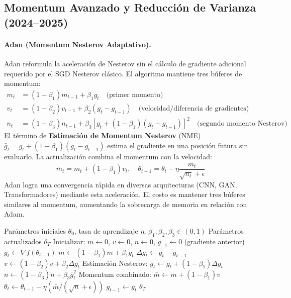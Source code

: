 \subsection{Momentum Avanzado y Reducción de Varianza (2024--2025)}
\paragraph{Adan (Momentum Nesterov Adaptativo).}
Adan reformula la aceleración de Nesterov sin el cálculo de gradiente adicional requerido por el SGD Nesterov clásico. El algoritmo mantiene tres búferes de momentum:
\begin{align}
m_t &= (1-\beta_1)m_{t-1} + \beta_1 g_t \quad\text{(primer momento)} \\
v_t &= (1-\beta_2)v_{t-1} + \beta_2(g_t - g_{t-1}) \quad\text{(velocidad/diferencia de gradientes)} \\
n_t &= (1-\beta_3)n_{t-1} + \beta_3[g_t + (1-\beta_1)(g_t-g_{t-1})]^2 \quad\text{(segundo momento Nesterov)}
\end{align}
El término de \textbf{Estimación de Momentum Nesterov} (NME) $\bar{g}_t = g_t + (1-\beta_1)(g_t-g_{t-1})$ estima el gradiente en una posición futura sin evaluarlo. La actualización combina el momentum con la velocidad:
\[\bar{m}_t = m_t + (1-\beta_1)v_t, \quad \theta_{t+1} = \theta_t - \eta\frac{\bar{m}_t}{\sqrt{n_t}+\epsilon}\]
Adan logra una convergencia rápida en diversas arquitecturas (CNN, GAN, Transformadores) mediante esta aceleración. El costo es mantener tres búferes similares al momentum, aumentando la sobrecarga de memoria en relación con Adam.

\begin{algorithm}[H]
\caption{Adan (Momentum Nesterov Adaptativo)}
\label{alg:adan}
\begin{algorithmic}[1]
\Require Parámetros iniciales $\theta_0$, tasa de aprendizaje $\eta$, $\beta_1, \beta_2, \beta_3 \in (0,1)$
\Ensure Parámetros actualizados $\theta_T$
\State Inicializar: $m \gets 0$, $v \gets 0$, $n \gets 0$, $g_{-1} \gets 0$ (gradiente anterior)
    \State $g_t \gets \nabla f(\theta_{t-1})$
    \State $m \gets (1-\beta_1) m + \beta_1 g_t$
    \State $\Delta g_t \gets g_t - g_{t-1}$
    \State $v \gets (1-\beta_2) v + \beta_2 \Delta g_t$
    \State Estimación Nesterov: $\bar{g}_t \gets g_t + (1-\beta_1) \Delta g_t$
    \State $n \gets (1-\beta_3) n + \beta_3 \bar{g}_t^2$
    \State Momentum combinado: $\bar{m} \gets m + (1-\beta_1) v$
    \State $\theta_t \gets \theta_{t-1} - \eta (\bar{m} / (\sqrt{n} + \epsilon))$
    \State $g_{t-1} \gets g_t$
\EndFor
\Return $\theta_T$
\end{algorithmic}
\end{algorithm}


